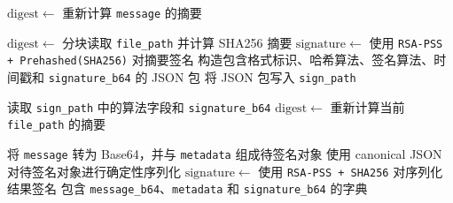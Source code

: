 \documentclass[12pt]{article}
\begin{document}
\begin{algorithm}[H]
\caption{\texttt{verify\_with\_digest(public\_key, message, signature, hash\_alg, sign\_alg)}}
\setcounter{AlgoLine}{0}
$\mathrm{digest} \leftarrow$ 重新计算 \texttt{message} 的摘要\;
\end{algorithm}

\begin{algorithm}[H]
\caption{\texttt{sign\_file(private\_key, file\_path, sign\_path)}}
\setcounter{AlgoLine}{0}
$\mathrm{digest} \leftarrow$ 分块读取 \texttt{file\_path} 并计算 SHA256 摘要\;
$\mathrm{signature} \leftarrow$ 使用 \texttt{RSA-PSS + Prehashed(SHA256)} 对摘要签名\;
构造包含格式标识、哈希算法、签名算法、时间戳和 \texttt{signature\_b64} 的 JSON 包\;
将 JSON 包写入 \texttt{sign\_path}\;
\end{algorithm}

\begin{algorithm}[H]
\caption{\texttt{verify\_file\_signature(public\_key, file\_path, sign\_path)}}
\setcounter{AlgoLine}{0}
读取 \texttt{sign\_path} 中的算法字段和 \texttt{signature\_b64}\;
$\mathrm{digest} \leftarrow$ 重新计算当前 \texttt{file\_path} 的摘要\;
\end{algorithm}

\begin{algorithm}[H]
\caption{\texttt{sign\_with\_metadata(private\_key, message, metadata)}}
\setcounter{AlgoLine}{0}
将 \texttt{message} 转为 Base64，并与 \texttt{metadata} 组成待签名对象\;
使用 canonical JSON 对待签名对象进行确定性序列化\;
$\mathrm{signature} \leftarrow$ 使用 \texttt{RSA-PSS + SHA256} 对序列化结果签名\;
\Return 包含 \texttt{message\_b64}、\texttt{metadata} 和 \texttt{signature\_b64} 的字典\;
\end{algorithm}
\end{document}
